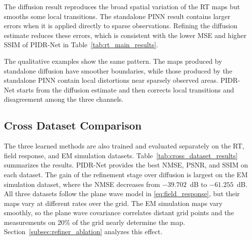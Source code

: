 \documentclass[lettersize,journal]{IEEEtran}
\begin{document}
The diffusion result reproduces the broad spatial variation of the RT maps but smooths some local transitions. The standalone PINN result contains larger errors when it is applied directly to sparse observations. Refining the diffusion estimate reduces these errors, which is consistent with the lower MSE and higher SSIM of PIDR-Net in Table~\ref{tab:rt_main_results}.

The qualitative examples show the same pattern. The maps produced by standalone diffusion have smoother boundaries, while those produced by the standalone PINN contain local distortions near sparsely observed areas. PIDR-Net starts from the diffusion estimate and then corrects local transitions and disagreement among the three channels.

\subsection{Cross Dataset Comparison}

The three learned methods are also trained and evaluated separately on the RT, field response, and EM simulation datasets. Table~\ref{tab:cross_dataset_results} summarizes the results. PIDR-Net provides the best NMSE, PSNR, and SSIM on each dataset. The gain of the refinement stage over diffusion is largest on the EM simulation dataset, where the NMSE decreases from $-39.702$~dB to $-61.255$~dB. All three datasets follow the plane wave model in \eqref{eq:field_response}, but their maps vary at different rates over the grid. The EM simulation maps vary smoothly, so the plane wave covariance correlates distant grid points and the measurements on $20\%$ of the grid nearly determine the map. Section~\ref{subsec:refiner_ablation} analyzes this effect.
\end{document}

